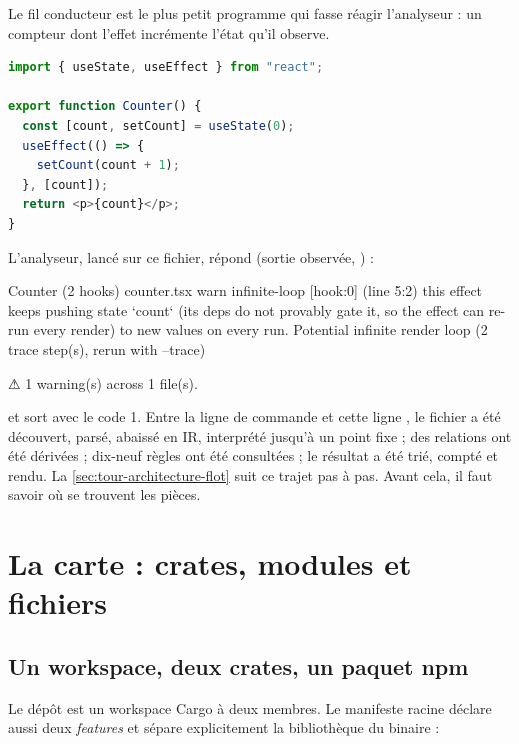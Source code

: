 Le fil conducteur est le plus petit programme qui fasse réagir l'analyseur : un compteur dont l'effet incrémente l'état qu'il observe.

\begin{lstlisting}[language=TypeScript,caption={Le programme témoin du chapitre (\file{/tmp/tour/counter.tsx})},label={lst:tour-counter}]
import { useState, useEffect } from "react";

export function Counter() {
  const [count, setCount] = useState(0);
  useEffect(() => {
    setCount(count + 1);
  }, [count]);
  return <p>{count}</p>;
}
\end{lstlisting}

L'analyseur, lancé sur ce fichier, répond (sortie observée, ) :

\begin{sortie}
  Counter  (2 hooks)  counter.tsx
    warn   infinite-loop  [hook:0]  (line 5:2)  this effect keeps pushing state `count` (its deps do not provably gate it, so the effect can re-run every render) to new values on every run. Potential infinite render loop
       (2 trace step(s), rerun with --trace)

⚠  1 warning(s) across 1 file(s).
\end{sortie}

et sort avec le code 1. Entre la ligne de commande et cette ligne , le fichier a été découvert, parsé, abaissé en IR, interprété jusqu'à un point fixe ; des relations ont été dérivées ; dix-neuf règles ont été consultées ; le résultat a été trié, compté et rendu. La \cref{sec:tour-architecture-flot} suit ce trajet pas à pas. Avant cela, il faut savoir où se trouvent les pièces.

\section{La carte : crates, modules et fichiers}
\label{sec:tour-architecture-carte}

\subsection{Un workspace, deux crates, un paquet npm}

Le dépôt est un workspace Cargo à deux membres. Le manifeste racine déclare aussi deux \emph{features} et sépare explicitement la bibliothèque du binaire :


